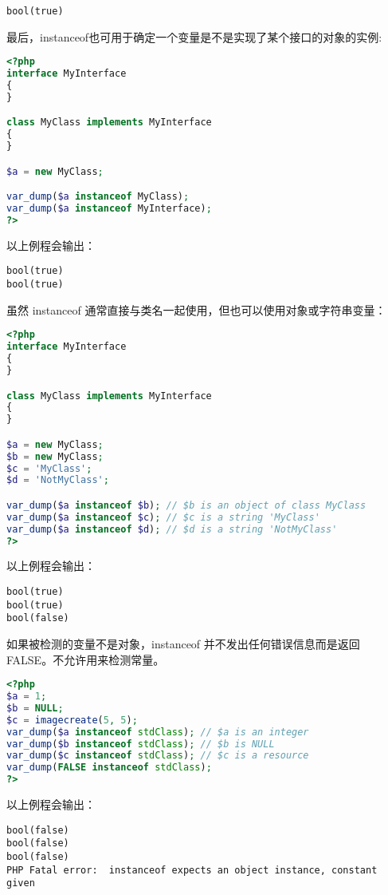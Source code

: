 \begin{verbatim}
bool(true)
\end{verbatim}

最后，instanceof也可用于确定一个变量是不是实现了某个接口的对象的实例:

\begin{lstlisting}[language=PHP]
<?php
interface MyInterface
{
}

class MyClass implements MyInterface
{
}

$a = new MyClass;

var_dump($a instanceof MyClass);
var_dump($a instanceof MyInterface);
?>
\end{lstlisting}

以上例程会输出：

\begin{verbatim}
bool(true)
bool(true)
\end{verbatim}

虽然 instanceof 通常直接与类名一起使用，但也可以使用对象或字符串变量：

\begin{lstlisting}[language=PHP]
<?php
interface MyInterface
{
}

class MyClass implements MyInterface
{
}

$a = new MyClass;
$b = new MyClass;
$c = 'MyClass';
$d = 'NotMyClass';

var_dump($a instanceof $b); // $b is an object of class MyClass
var_dump($a instanceof $c); // $c is a string 'MyClass'
var_dump($a instanceof $d); // $d is a string 'NotMyClass'
?>
\end{lstlisting}

以上例程会输出：

\begin{verbatim}
bool(true)
bool(true)
bool(false)
\end{verbatim}


如果被检测的变量不是对象，instanceof 并不发出任何错误信息而是返回 FALSE。不允许用来检测常量。

\begin{lstlisting}[language=PHP]
<?php
$a = 1;
$b = NULL;
$c = imagecreate(5, 5);
var_dump($a instanceof stdClass); // $a is an integer
var_dump($b instanceof stdClass); // $b is NULL
var_dump($c instanceof stdClass); // $c is a resource
var_dump(FALSE instanceof stdClass);
?>
\end{lstlisting}

以上例程会输出：

\begin{verbatim}
bool(false)
bool(false)
bool(false)
PHP Fatal error:  instanceof expects an object instance, constant given
\end{verbatim}


